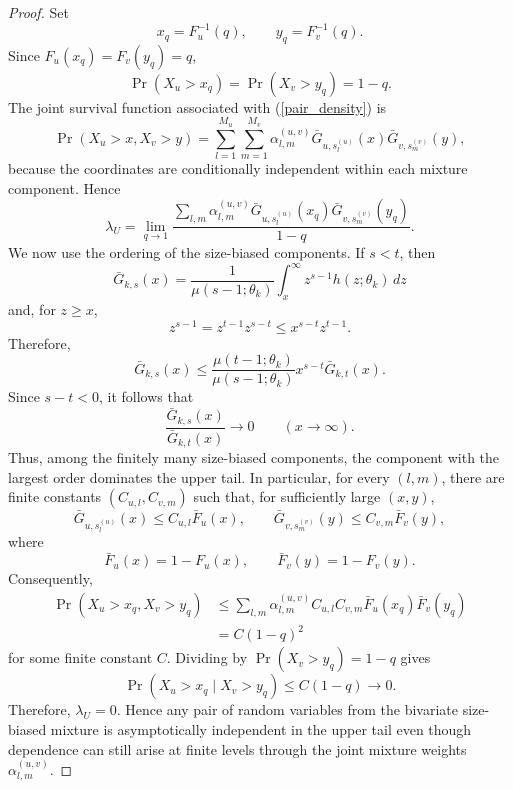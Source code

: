 \documentclass[eng]{csam}
\begin{document}
{\begin{proof}
Set
\begin{equation*}
x_q=F_u^{-1}(q),\qquad y_q=F_v^{-1}(q).
\end{equation*}
Since $F_u(x_q)=F_v(y_q)=q$,
\begin{equation*}
\Pr(X_u>x_q)=\Pr(X_v>y_q)=1-q.
\end{equation*}
The joint survival function associated with (\ref{pair_density}) is
\begin{equation*}
\Pr(X_u>x,X_v>y) = \sum_{l=1}^{M_u}\sum_{m=1}^{M_v} \alpha^{(u,v)}_{l,m} \bar G_{u,s_l^{(u)}}(x) \bar G_{v,s_m^{(v)}}(y),
\end{equation*}
because the coordinates are conditionally independent within each mixture component. Hence
\begin{equation*}
\lambda_U = \lim_{q\to1} \frac{ \sum_{l,m}\alpha^{(u,v)}_{l,m} \bar G_{u,s_l^{(u)}}(x_q) \bar G_{v,s_m^{(v)}}(y_q) }{1-q}.
\end{equation*}
We now use the ordering of the size-biased components. If $s<t$, then
\begin{equation*}
\bar G_{k,s}(x) = \frac{1}{\mu(s-1;\theta_k)} \int_x^\infty z^{s-1}h(z;\theta_k)\,dz
\end{equation*}
and, for $z\ge x$,
\begin{equation*}
z^{s-1} =z^{t-1}z^{s-t} \le x^{s-t}z^{t-1}.
\end{equation*}
Therefore,
\begin{equation*}
\bar G_{k,s}(x) \le \frac{\mu(t-1;\theta_k)}{\mu(s-1;\theta_k)} x^{s-t}\bar G_{k,t}(x).
\end{equation*}
Since $s-t<0$, it follows that
\begin{equation*}
\frac{\bar G_{k,s}(x)}{\bar G_{k,t}(x)} \longrightarrow 0 \qquad (x\to\infty).
\end{equation*}
Thus, among the finitely many size-biased components, the component with the largest order dominates the upper tail. In particular, for every $(l,m)$, there are finite constants $(C_{u,l},C_{v,m})$ such that, for sufficiently large $(x,y)$,
\begin{equation*}
\bar G_{u,s_l^{(u)}}(x)\le C_{u,l}\bar F_u(x), \qquad \bar G_{v,s_m^{(v)}}(y)\le C_{v,m}\bar F_v(y),
\end{equation*}
where
\begin{equation*}
\bar F_u(x)=1-F_u(x),\qquad \bar F_v(y)=1-F_v(y).
\end{equation*}
Consequently,
\begin{align*}
\Pr(X_u>x_q,X_v>y_q) &\le \sum_{l,m}\alpha^{(u,v)}_{l,m} C_{u,l}C_{v,m} \bar F_u(x_q)\bar F_v(y_q)\\
&=C(1-q)^2
\end{align*}
for some finite constant $C$. Dividing by $\Pr(X_v>y_q)= 1-q$ gives
\begin{equation*}
\Pr(X_u>x_q\mid X_v>y_q) \le C(1-q)\longrightarrow 0.
\end{equation*}
Therefore, $\lambda_U=0$. Hence any pair of random variables from the bivariate size-biased mixture is asymptotically independent in the upper tail even though dependence can still arise at finite levels through the joint mixture weights $\alpha^{(u,v)}_{l,m}$.
\end{proof}
}
\end{document}
